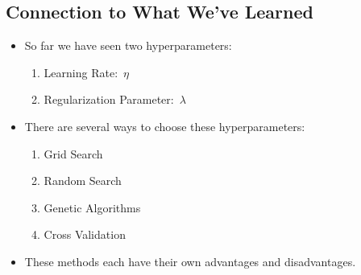 \documentclass[12pt]{article}
\begin{document}
        \subsection{Connection to What We've Learned}
            \begin{itemize}
                \item So far we have seen two hyperparameters:
                \begin{enumerate}
                    \item Learning Rate:\ $\eta$
                    \item Regularization Parameter:\ $\lambda$
                \end{enumerate}
                \item There are several ways to choose these hyperparameters:
                \begin{enumerate}
                    \item Grid Search
                    \item Random Search
                    \item Genetic Algorithms
                    \item Cross Validation
                \end{enumerate}
                \item These methods each have their own advantages and disadvantages.
            \end{itemize}
\end{document}
